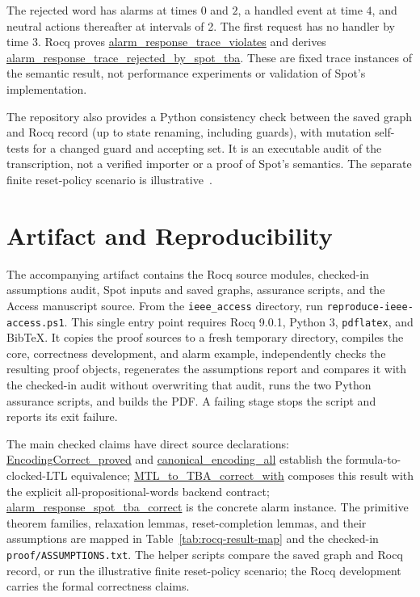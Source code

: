 \documentclass{ieeeaccess}
\newcommand{\Rocqid}[1]{\url{#1}}
\begin{document}
The rejected word has alarms at times $0$ and $2$, a handled event at time
$4$, and neutral actions thereafter at intervals of 2. The first request has
no handler by time 3. Rocq proves
\Rocqid{alarm_response_trace_violates} and derives
\Rocqid{alarm_response_trace_rejected_by_spot_tba}. These are fixed trace
instances of the semantic result, not performance experiments or validation
of Spot's implementation.

The repository also provides a Python consistency check between the saved
graph and Rocq record (up to state renaming, including guards), with mutation
self-tests for a changed guard and accepting set. It is an executable audit of
the transcription, not a verified importer or a proof of Spot's semantics.
The separate finite reset-policy scenario is illustrative~\cite{openai_codex}.

\section{Artifact and Reproducibility}
\label{sec:artifact}
The accompanying artifact contains the Rocq source modules, checked-in
assumptions audit, Spot inputs and saved graphs, assurance scripts, and the
Access manuscript source. From the \texttt{ieee\_access} directory, run
\texttt{reproduce-ieee-access.ps1}. This single entry point requires Rocq
9.0.1, Python 3, \texttt{pdflatex}, and BibTeX. It copies the proof sources to
a fresh temporary directory, compiles the core, correctness development, and
alarm example, independently checks the resulting proof objects, regenerates
the assumptions report and compares it with the checked-in audit without
overwriting that audit, runs the two Python assurance scripts, and builds the
PDF. A failing stage stops the script and reports its exit failure.

The main checked claims have direct source declarations:
\Rocqid{EncodingCorrect\_proved} and
\Rocqid{canonical\_encoding\_all} establish the formula-to-clocked-LTL
equivalence; \Rocqid{MTL\_to\_TBA\_correct\_with} composes this result with
the explicit all-propositional-words backend contract;
\Rocqid{alarm\_response\_spot\_tba\_correct} is the concrete alarm
instance. The primitive theorem families, relaxation lemmas, reset-completion
lemmas, and their assumptions are mapped in
Table~\ref{tab:rocq-result-map} and the checked-in \texttt{proof/ASSUMPTIONS.txt}.
The helper scripts compare the saved graph and Rocq record, or run the
illustrative finite reset-policy scenario; the Rocq development carries the
formal correctness claims.
\end{document}
